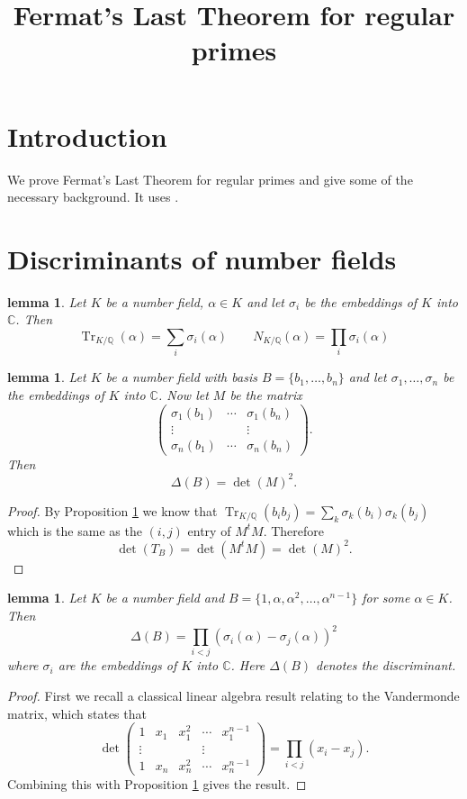 \documentclass[11pt,a4paper]{amsart}
\title{Fermat's Last Theorem for regular primes}
\theoremstyle{plain}
\newtheorem{lemma}[subsection]{lemma}
\theoremstyle{definition}
\theoremstyle{definition}
\newcommand{\Tr}{\operatorname{Tr}}
\def\CC{\mathbb{C}}
\def\QQ{\mathbb{Q}}
\def \a{\alpha}
\begin{document}
	\maketitle
	\tableofcontents
	\section{Introduction}
	We prove Fermat's Last Theorem for regular primes and give some of the necessary background. It uses \cite{Samuel,marcus,washington}.	
	
	\section{Discriminants of number fields}	
	\begin{lemma}\label{lemma: alt definition of norm and trace}
		Let $K$ be a number field, $\a \in K$ and let $\sigma_i$ be the embeddings of $K$ into $\CC$. Then \[\Tr_{K/\QQ}(\a) =\sum_i \sigma_i(\a) \qquad N_{K/\QQ}(\a)=\prod_i \sigma_i(\a)  \]
	\end{lemma}
	
	\begin{lemma}\label{lemma: disc via embs}
		Let $K$ be a number field with basis $B=\{b_1,\dots,b_n\}$ and let $\sigma_1,\dots,\sigma_n$ be the embeddings of $K$ into $\CC$. Now let $M$ be the matrix  \[\left (\begin{matrix} \sigma_1(b_1) &\cdots& \sigma_1(b_n)\\ \vdots & & \vdots \\  \sigma_n(b_1) &\cdots& \sigma_n(b_n)
		\end{matrix} \right ).\] Then \[\Delta(B)=\det(M)^2.\]
	\end{lemma}
	
	
	\begin{proof}
		By Proposition \ref{lemma: alt definition of norm and trace} we know that  $\Tr_{K/\QQ}(b_i b_j)= \sum_k \sigma_k(b_i)\sigma_k(b_j)$ which is the same as the $(i,j)$ entry of $M^t M$. Therefore \[\det(T_B)=\det(M^t M)=\det(M)^2.\]
	\end{proof}
	
	\begin{lemma}\label{lemma: disc of prim elt basis}
		Let $K$ be a number field and $B=\{1,\a,\a^2,\dots,\a^{n-1}\}$ for some $\a \in K$. Then \[\Delta(B)=\prod_{i < j} (\sigma_i(\a)-\sigma_j(\a))^2\] where $\sigma_i$ are the embeddings of $K $ into $\CC$. Here $\Delta(B)$ denotes the discriminant.
	\end{lemma}
	\begin{proof}
		First we recall a classical linear algebra result relating to the Vandermonde matrix, which states that  \[\det \left (\begin{matrix} 1 & x_1& x_1^2&\cdots&x_1^{n-1} \\ \vdots & & & \vdots \\   1 & x_n& x_n^2&\cdots&x_n^{n-1}
		\end{matrix} \right ) =\prod_{i<j} (x_i-x_j).\] Combining this with Proposition \ref{lemma: disc via embs} gives the result.
	\end{proof}
	
\end{document}
